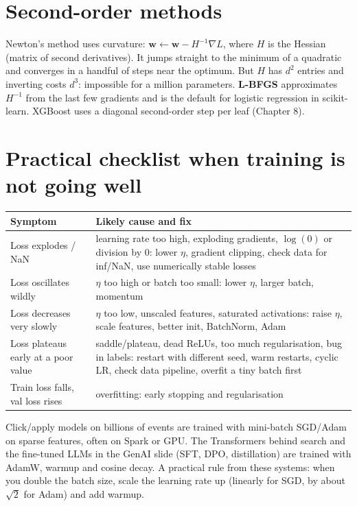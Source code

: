 \section{Second-order methods}
Newton's method uses curvature: $\mathbf w \leftarrow \mathbf w - H^{-1}\nabla L$, where $H$ is the Hessian (matrix of second
derivatives). It jumps straight to the minimum of a quadratic and converges in a handful of steps near the optimum. But
$H$ has $d^2$ entries and inverting costs $d^3$: impossible for a million parameters. \textbf{L-BFGS} approximates
$H^{-1}$ from the last few gradients and is the default for logistic regression in scikit-learn. XGBoost uses a diagonal
second-order step per leaf (Chapter 8).

\section{Practical checklist when training is not going well}
\begin{center}\small
\begin{tabularx}{\linewidth}{X X}
\toprule
Symptom & Likely cause and fix\\
\midrule
Loss explodes / NaN & learning rate too high, exploding gradients, $\log(0)$ or division by 0: lower $\eta$, gradient
clipping, check data for inf/NaN, use numerically stable losses\\
Loss oscillates wildly & $\eta$ too high or batch too small: lower $\eta$, larger batch, momentum\\
Loss decreases very slowly & $\eta$ too low, unscaled features, saturated activations: raise $\eta$, scale features, better
init, BatchNorm, Adam\\
Loss plateaus early at a poor value & saddle/plateau, dead ReLUs, too much regularisation, bug in labels: restart with
different seed, warm restarts, cyclic LR, check data pipeline, overfit a tiny batch first\\
Train loss falls, val loss rises & overfitting: early stopping and regularisation\\
\bottomrule
\end{tabularx}
\end{center}

\begin{practical}
Click/apply models on billions of events are trained with mini-batch SGD/Adam on sparse features, often on Spark or
GPU. The Transformers behind search and the fine-tuned LLMs in the GenAI slide (SFT, DPO, distillation) are trained with
AdamW, warmup and cosine decay. A practical rule from these systems: when you double the batch size, scale the learning
rate up (linearly for SGD, by about $\sqrt2$ for Adam) and add warmup.
\end{practical}

